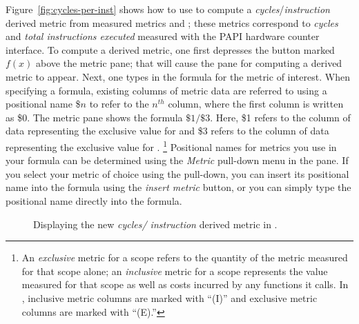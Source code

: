 \documentclass[11pt,twoside,letterpaper]{report}
\begin{document}
Figure~\ref{fig:cycles-per-inst} shows how to use \hpcviewer{} to compute a \emph{cycles}/\emph{instruction} derived metric from measured metrics  and ; these metrics correspond to {\em cycles} and {\em total instructions executed} measured with the PAPI hardware counter interface.
To compute a derived metric, one first depresses the button marked $f(x)$ above the metric pane; that will cause the pane for computing a derived metric to appear.
Next, one types in the formula for the metric of interest.
When specifying a formula, existing columns of metric data are referred to using a positional name \$$n$ to refer to the $n^{th}$ column, where the first column is written as \$0.
The metric pane shows the formula $\$1/\$3$.
Here, \$1 refers to the column of data representing the exclusive value for  and \$3 refers to the column of data representing the exclusive value for .%
\footnote{An {\em exclusive} metric for a scope refers to the quantity of the metric measured for that scope alone; an \emph{inclusive} metric for a scope represents the value measured for that scope as well as costs incurred by any functions it calls. In \hpcviewer{}, inclusive metric columns are marked with ``(I)'' and exclusive metric columns are marked with ``(E).''}
Positional names for metrics you use in your formula can be determined using the \emph{Metric} pull-down menu in the pane.
If you select your metric of choice using the pull-down, you can insert its positional name into the formula using the {\em insert metric} button, or you can simply type the positional name directly into the formula.

\begin{figure}[t]
\caption{Displaying the new {\em cycles/ instruction} derived metric in \hpcviewer{}.}
\label{fig:cycles-per-inst-2}
\end{figure}
\end{document}
